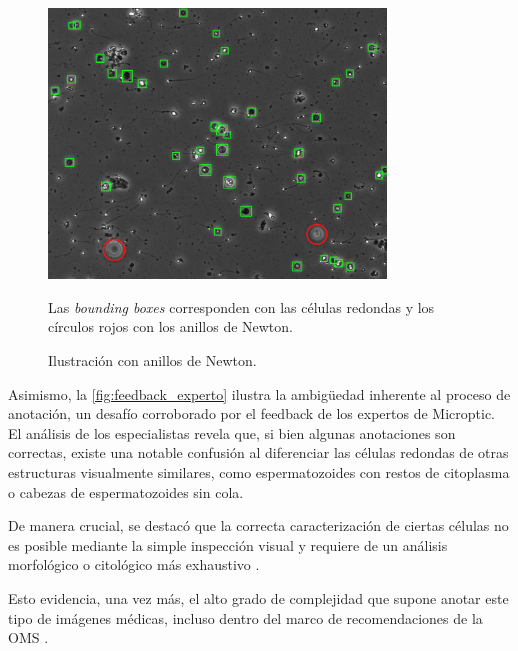 \documentclass[12pt,a4paper,onecolumn,oneside]{report}
\begin{document}
\begin{figure}[H]
  \centering
  \includegraphics[width=0.8\textwidth]{figuras/rounds_cells/Anillos de Newton.png}
  \caption{Ilustración con anillos de Newton.}
  \label{fig:Anillos_Newton}
  Las \textit{bounding boxes} corresponden con las células redondas y los círculos rojos con los anillos de Newton.
\end{figure}

Asimismo, la \autoref{fig:feedback_experto} ilustra la ambigüedad inherente al proceso de anotación, un desafío corroborado por el feedback de los expertos de Microptic. El análisis de los especialistas 
revela que, si bien algunas anotaciones son correctas, existe una notable confusión al diferenciar las células redondas de otras estructuras visualmente similares, 
como espermatozoides con restos de citoplasma o cabezas de espermatozoides sin cola.

De manera crucial, se destacó que la correcta caracterización de ciertas células no es posible mediante la simple inspección visual y 
requiere de un análisis morfológico o citológico más exhaustivo \cite{OMS}.

Esto evidencia, una vez más, el alto grado de complejidad que supone anotar este tipo de imágenes médicas, incluso dentro del marco de recomendaciones de la OMS \cite{OMS} \cite{BJBS}.
\end{document}

